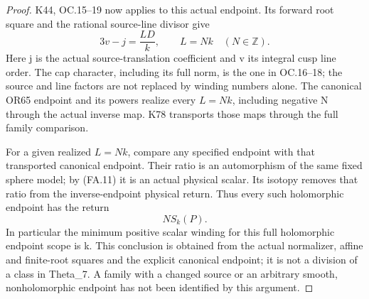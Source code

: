 \begin{proof}
K44, OC.15--19 now applies to this actual endpoint. Its forward root
square and the rational source-line divisor give
\[
                  3v-j=\frac{L D}{k},\qquad
                         L=N k\quad(N\in\mathbb Z).      \tag{FA.14}
\]
Here j is the actual source-translation coefficient and v its integral
cusp line order. The cap character, including its full norm, is the one
in OC.16--18; the source and line factors are not replaced by winding
numbers alone. The canonical OR65 endpoint and its powers realize every
\(L=Nk\), including negative N through the actual inverse map. K78 transports
those maps through the full family comparison.

For a given realized \(L=Nk\), compare any specified endpoint with that
transported canonical endpoint. Their ratio is an automorphism of the
same fixed sphere model; by (FA.11) it is an actual physical scalar.
Its isotopy removes that ratio from the inverse-endpoint physical
return. Thus every such holomorphic endpoint has the return
\[
                                N S_k(P).                \tag{FA.15}
\]
In particular the minimum positive scalar winding for this full
holomorphic endpoint scope is k. This conclusion is obtained from the
actual normalizer, affine and finite-root squares and the explicit
canonical endpoint; it is not a division of a class in Theta\_7. A family
with a changed source or an arbitrary smooth, nonholomorphic endpoint
has not been identified by this argument.

\end{proof}
